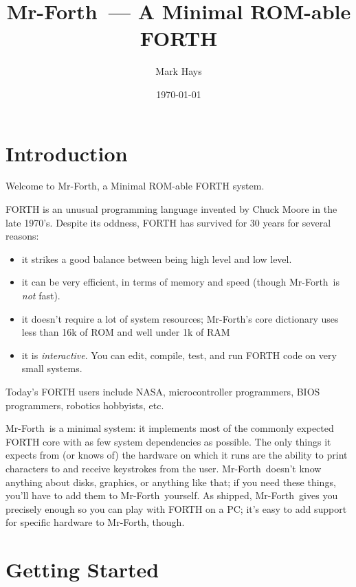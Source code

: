 \documentclass{article}
\begin{document}
\newcommand{\T}[1]{\texttt{#1}}
\newcommand{\M}{Mr-Forth}

\title{\M\ --- A Minimal ROM-able FORTH}
\author{Mark Hays}
\date{\today}
\maketitle

\section*{Introduction}

Welcome to \M, a Minimal ROM-able FORTH system.

FORTH is an unusual programming language invented by Chuck Moore in
the late 1970's. Despite its oddness, FORTH has survived for 30 years
for several reasons:
\begin{itemize}
\item it strikes a good balance between being high level and low level.
\item it can be very efficient, in terms of memory and speed (though \M\ 
  is \textit{not} fast).
\item it doesn't require a lot of system resources; \M's core
  dictionary uses less than 16k of ROM and well under 1k of RAM
\item it is \textit{interactive}. You can edit, compile, test, and
  run FORTH code on very small systems.
\end{itemize}
Today's FORTH users include NASA, microcontroller programmers, BIOS
programmers, robotics hobbyists, etc.

\M\ is a minimal system: it implements most of the commonly expected
FORTH core with as few system dependencies as possible. The only things
it expects from (or knows of) the hardware on which it runs are the
ability to print characters to and receive keystrokes from the user.
\M\ doesn't know anything about disks, graphics, or anything like
that; if you need these things, you'll have to add them to \M\ 
yourself. As shipped, \M\ gives you precisely enough so you can play
with FORTH on a PC; it's easy to add support for specific hardware to
\M, though.

\section*{Getting Started}
\end{document}
